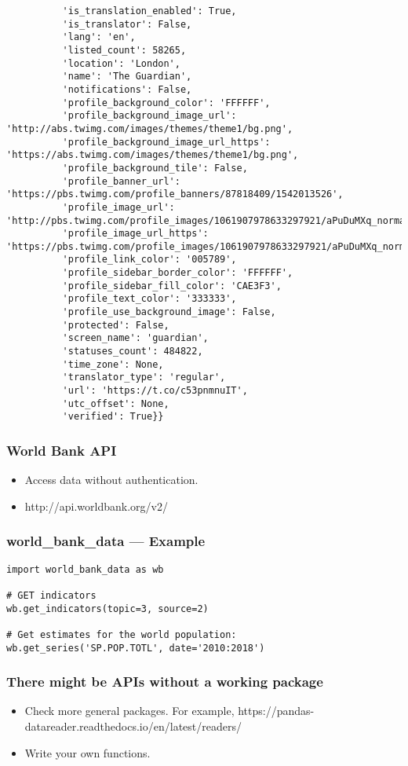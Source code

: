 \begin{frame}[fragile]
\begin{verbatim}
          'is_translation_enabled': True,
          'is_translator': False,
          'lang': 'en',
          'listed_count': 58265,
          'location': 'London',
          'name': 'The Guardian',
          'notifications': False,
          'profile_background_color': 'FFFFFF',
          'profile_background_image_url': 'http://abs.twimg.com/images/themes/theme1/bg.png',
          'profile_background_image_url_https': 'https://abs.twimg.com/images/themes/theme1/bg.png',
          'profile_background_tile': False,
          'profile_banner_url': 'https://pbs.twimg.com/profile_banners/87818409/1542013526',
          'profile_image_url': 'http://pbs.twimg.com/profile_images/1061907978633297921/aPuDuMXq_normal.jpg',
          'profile_image_url_https': 'https://pbs.twimg.com/profile_images/1061907978633297921/aPuDuMXq_normal.jpg',
          'profile_link_color': '005789',
          'profile_sidebar_border_color': 'FFFFFF',
          'profile_sidebar_fill_color': 'CAE3F3',
          'profile_text_color': '333333',
          'profile_use_background_image': False,
          'protected': False,
          'screen_name': 'guardian',
          'statuses_count': 484822,
          'time_zone': None,
          'translator_type': 'regular',
          'url': 'https://t.co/c53pnmnuIT',
          'utc_offset': None,
          'verified': True}}
\end{verbatim}

\end{frame}


\begin{frame}
    \frametitle{World Bank API}
    \begin{itemize}
        \item Access data without authentication.
        \item http://api.worldbank.org/v2/
    \end{itemize}
\end{frame}

\begin{frame}[fragile]
    \frametitle{world\_bank\_data --- Example}
\begin{verbatim}
import world_bank_data as wb

# GET indicators
wb.get_indicators(topic=3, source=2)

# Get estimates for the world population:
wb.get_series('SP.POP.TOTL', date='2010:2018')
\end{verbatim}
\end{frame}

\begin{frame}
    \frametitle{There might be APIs without a working package}
    \begin{itemize}
        \item Check more general packages. For example, https://pandas-datareader.readthedocs.io/en/latest/readers/
        \item Write your own functions.
    \end{itemize}
\end{frame}

